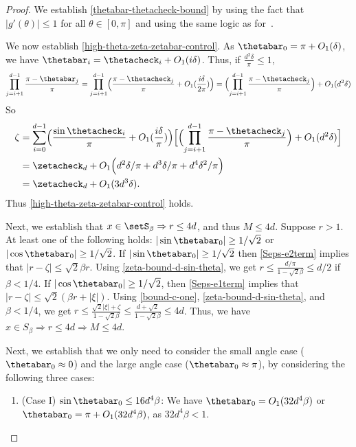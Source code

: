 \begin{proof}
We establish \eqref{thetabar-thetacheck-bound} by using the fact that $|g'(\theta)| \leq 1$ for all $\theta \in [0, \pi]$ and using the same logic as for~\cite[Eq.~17]{hand_global_2017}.

We now establish \eqref{high-theta-zeta-zetabar-control}.  As $\thetabar_0 = \pi + O_1(\delta)$, we have $\thetabar_i = \thetacheck_i + O_1(i \delta)$.  Thus, if $\frac{d^2 \delta}{\pi}\leq 1$,
\[
\prod_{j=i+1}^{d-1} \frac{\pi - \thetabar_j}{\pi} = \prod_{j=i+1}^{d-1} \Bigl( \frac{\pi - \thetacheck_j}{\pi} + O_1(\frac{i \delta}{2 \pi} ) \Bigr) = \Bigl(\prod_{j=i+1}^{d-1}  \frac{\pi - \thetacheck_j}{\pi} \Bigr)  + O_1(d^2 \delta )
\]
So
\begin{align}
\zeta &= \sum_{i=0}^{d-1} \Bigl( \frac{\sin \thetacheck_i}{\pi} + O_1(\frac{i \delta}{\pi}) \Bigr)  \Bigl[ \Bigl(\prod_{j=i+1}^{d-1} \frac{\pi - \thetacheck_j}{\pi} \Bigr) +O_1(d^2 \delta)  \Bigr] \\
&= \zetacheck_d + O_1 \Bigl( d^2\delta / \pi + d^3 \delta /\pi + d^4 \delta^2/\pi   \Bigr) \\
&= \zetacheck_d + O_1( 3 d^3 \delta).
\end{align}
Thus \eqref{high-theta-zeta-zetabar-control} holds.

Next, we establish that $x \in \setS_\beta \Rightarrow r \leq 4d$, and thus $M \leq 4d$.  Suppose $r > 1$.  At least one of the following holds: $|\sin\thetabar_0| \geq 1/\sqrt{2}$ or $|\cos \thetabar_0| \geq 1/\sqrt{2}$. If $|\sin \thetabar_0| \geq 1/\sqrt{2}$ then  \eqref{Seps-e2term} implies that $|r - \zeta| \leq \sqrt{2} \beta r$.  Using \eqref{zeta-bound-d-sin-theta}, we get $ r \leq \frac{d/\pi}{1 - \sqrt{2} \beta} \leq d/2$ if $\beta < 1/4$.  If $| \cos \thetabar_0| \geq 1/\sqrt{2}$, then \eqref{Seps-e1term} implies that 
$|r - \zeta| \leq \sqrt{2} (\beta r + |\xi|)$.   Using \eqref{bound-c-one}, \eqref{zeta-bound-d-sin-theta}, and $\beta<1/4$, we get $r \leq \frac{\sqrt{2} |\xi| +  \zeta}{1 - \sqrt{2}{\beta}} \leq \frac{d + \sqrt{2}}{1 - \sqrt{2} \beta} \leq 4 d$. Thus, we have $x \in S_\beta \Rightarrow r \leq 4d \Rightarrow M \leq 4d$. 

Next, we establish that we only need to consider the small angle case ($\thetabar_0 \approx 0$) and the large angle case ($\thetabar_0 \approx \pi$), by considering the following three cases:
\begin{enumerate}
\item[] (Case I) $\sin \thetabar_0 \leq 16 d^4 \beta$: We have $\thetabar_0 = O_1(32 d^4 \beta)$ or $\thetabar_0 = \pi + O_1(32 d^4 \beta)$, as $32 d^4 \beta < 1$.  


\end{enumerate}
\end{proof}
